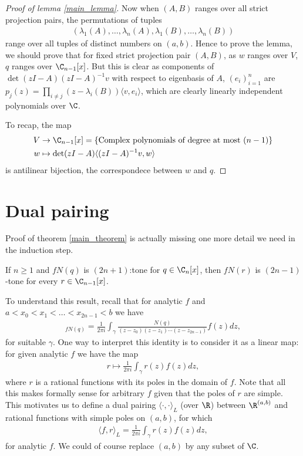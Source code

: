 \begin{proof}[Proof of lemma \ref{main_lemma}]
	Now when $(A, B)$ ranges over all strict projection pairs, the permutations of tuples
	\begin{align}
	(\lambda_{1}(A), \ldots, \lambda_{n}(A), \lambda_{1}(B), \ldots, \lambda_{n}(B))
	\end{align}
	range over all tuples of distinct numbers on $(a, b)$. Hence to prove the lemma, we should prove that for fixed strict projection pair $(A, B)$, as $w$ ranges over $V$, $q$ ranges over $\C_{n - 1}[x]$. But this is clear as components of $\det(z I - A)(z I - A)^{-1} v$ with respect to eigenbasis of $A$, $(e_{i})_{i = 1}^{n}$ are $p_{j}(z) = \prod_{i \neq j}(z - \lambda_{i}(B)) \langle v, e_{i} \rangle$, which are clearly linearly independent polynomials over $\C$.

	To recap, the map
	\begin{align*}
		V &\to \C_{n - 1}[x] = \{\text{Complex polynomials of degree at most } (n - 1) \} \\
		w &\mapsto \det(z I - A) \langle (z I - A)^{-1} v, w \rangle
	\end{align*}
	is antilinear bijection, the correspondece between $w$ and $q$.
\end{proof}

\section{Dual pairing}

Proof of theorem \ref{main_theorem} is actually missing one more detail we need in the induction step.

\begin{lem}\label{k_tone_cor}
	If $n \geq 1$ and $f N(q)$ is $(2 n + 1)$:tone for $q \in \C_{n}[x]$, then $f N(r)$ is $(2 n - 1)$-tone for every $r \in \C_{n - 1}[x]$.
\end{lem}

To understand this result, recall that for analytic $f$ and $a < x_{0} < x_{1} < \ldots < x_{2 n - 1} < b$ we have
\begin{align*}
	[x_{0}, x_{1}, \ldots, x_{2 n - 1}]_{f N(q)} = \frac{1}{2 \pi i} \int_{\gamma} \frac{N(q)}{(z - z_{0}) (z - z_{1}) \cdots (z - z_{2 n - 1})} f(z) dz,
\end{align*}
for suitable $\gamma$. One way to interpret this identity is to consider it as a linear map: for given analytic $f$ we have the map
\begin{align*}
	r \mapsto  \frac{1}{2 \pi i} \int_{\gamma} r(z) f(z) dz,
\end{align*}
where $r$ is a rational functions with its poles in the domain of $f$. Note that all this makes formally sense for arbitrary $f$ given that the poles of $r$ are simple. This motivates us to define a dual pairing $\langle \cdot, \cdot \rangle_{L}$ (over $\R$) between $\R^{(a, b)}$ and rational functions with simple poles on $(a, b)$, for which
\begin{align*}
	\langle f, r \rangle_{L} = \frac{1}{2 \pi i} \int_{\gamma} r(z) f(z) dz,
\end{align*}
for analytic $f$. We could of course replace $(a, b)$ by any subset of $\C$.

